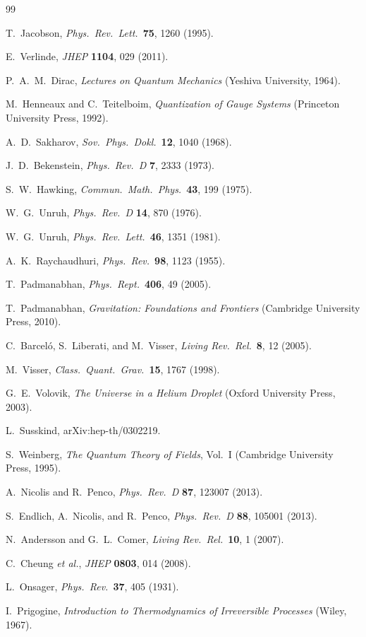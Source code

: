 \documentclass[11pt,a4paper]{article}
\begin{document}
\begin{thebibliography}{99}

 T.~Jacobson, {\em Phys.\ Rev.\ Lett.}\ {\bf 75}, 1260 (1995).

 E.~Verlinde, {\em JHEP} {\bf 1104}, 029 (2011).

 P.~A.~M.~Dirac, {\em Lectures on Quantum Mechanics} (Yeshiva University, 1964).

 M.~Henneaux and C.~Teitelboim, {\em Quantization of Gauge Systems} (Princeton University Press, 1992).

 A.~D.~Sakharov, {\em Sov.\ Phys.\ Dokl.}\ {\bf 12}, 1040 (1968).

 J.~D.~Bekenstein, {\em Phys.\ Rev.\ D} {\bf 7}, 2333 (1973).

 S.~W.~Hawking, {\em Commun.\ Math.\ Phys.}\ {\bf 43}, 199 (1975).

 W.~G.~Unruh, {\em Phys.\ Rev.\ D} {\bf 14}, 870 (1976).

 W.~G.~Unruh, {\em Phys.\ Rev.\ Lett.}\ {\bf 46}, 1351 (1981).

 A.~K.~Raychaudhuri, {\em Phys.\ Rev.}\ {\bf 98}, 1123 (1955).

 T.~Padmanabhan, {\em Phys.\ Rept.}\ {\bf 406}, 49 (2005).

 T.~Padmanabhan, {\em Gravitation: Foundations and Frontiers} (Cambridge University Press, 2010).

 C.~Barceló, S.~Liberati, and M.~Visser, {\em Living Rev.\ Rel.}\ {\bf 8}, 12 (2005).

 M.~Visser, {\em Class.\ Quant.\ Grav.}\ {\bf 15}, 1767 (1998).

 G.~E.~Volovik, {\em The Universe in a Helium Droplet} (Oxford University Press, 2003).

 L.~Susskind, arXiv:hep-th/0302219.

 S.~Weinberg, {\em The Quantum Theory of Fields}, Vol.~I (Cambridge University Press, 1995).

 A.~Nicolis and R.~Penco, {\em Phys.\ Rev.\ D} {\bf 87}, 123007 (2013).

 S.~Endlich, A.~Nicolis, and R.~Penco, {\em Phys.\ Rev.\ D} {\bf 88}, 105001 (2013).

 N.~Andersson and G.~L.~Comer, {\em Living Rev.\ Rel.}\ {\bf 10}, 1 (2007).

 C.~Cheung {\em et al.}, {\em JHEP} {\bf 0803}, 014 (2008).

 L.~Onsager, {\em Phys.\ Rev.}\ {\bf 37}, 405 (1931).

 I.~Prigogine, {\em Introduction to Thermodynamics of Irreversible Processes} (Wiley, 1967).

\end{thebibliography}
\end{document}
